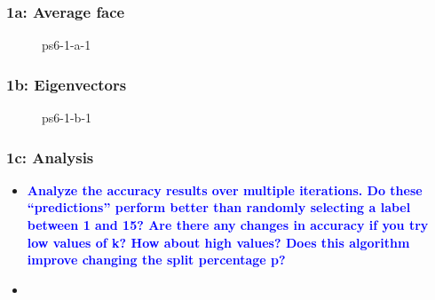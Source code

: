 \documentclass[../report.tex]{subfiles}
\begin{document}
    \begin{frame}
        \frametitle{1a: Average face}
        \begin{figure}[!htb]
            \centering
            \caption{ps6-1-a-1} 
        \end{figure}
    \end{frame}

    \begin{frame}
        \frametitle{1b: Eigenvectors}
        \begin{figure}[!htb]
            \centering
            \caption{ps6-1-b-1} 
        \end{figure}
    \end{frame}

    \begin{frame}[t]
        \frametitle{1c: Analysis}
        \begin{normalsize}
            \begin{itemize}
                \setlength\itemsep{1em}\fontsize{6pt}{6pt}

                \item[]{\textbf{\selectfont\textcolor{blue}{ Analyze the accuracy results over multiple iterations. Do these “predictions” perform better than randomly selecting a label between 1 and 15? Are there any changes in accuracy if you try low values of k? How about high values? Does this algorithm improve changing the split percentage p? }}}
                
                \item[]\textbf{}
            \end{itemize}
        \end{normalsize}
    \end{frame}
    
\end{document}

